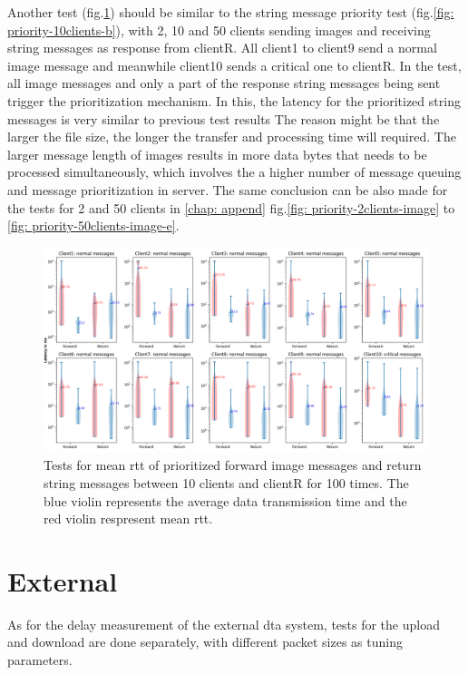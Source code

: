 Another test (fig.\ref{fig: priority-10clients-d}) should be similar to the string message priority test (fig.\ref{fig: priority-10clients-b}), 
with 2, 10 and 50 clients sending images and receiving string messages as response 
from clientR. 
All client1 to client9 send a normal image message and meanwhile 
client10 sends a critical one to clientR. 
In the test, all image messages and only a part of the response string messages 
being sent trigger the prioritization mechanism.  In this, the latency for 
the prioritized string messages is very similar to previous test results
The reason might be that the larger the file size, the longer the transfer 
and processing time will required. The larger message length of images 
results in more data bytes 
that needs to be processed simultaneously, which involves the a higher number of 
message queuing and message prioritization in server. The same conclusion can be 
also made for the tests for 2 and 50 clients in \ref{chap: append} fig.\ref{fig: priority-2clients-image} 
to \ref{fig: priority-50clients-image-e}.


\begin{figure}
    \includegraphics[width=\textheight]{figures/tests/priority_tests/log_violin_10clients_image_priority.png}\hfill 
    \caption{Tests for mean \gls{rtt} of prioritized forward image messages and return string messages between 10 clients 
    and clientR for 100 times. The blue violin represents the average data transmission time and the red violin 
    respresent mean \gls{rtt}.} \label{fig: priority-10clients-d}
\end{figure}



\section{External}\label{chap: Result-External}
As for the delay measurement of the external \gls{dta} system, tests for the 
upload and download are done separately, with different packet sizes as tuning 
parameters. 



